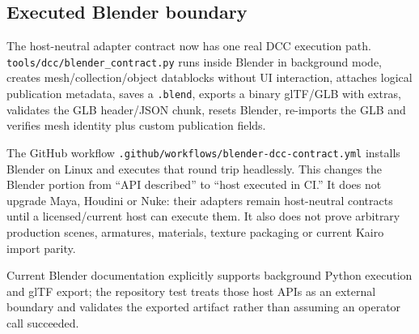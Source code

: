 \subsection{Executed Blender boundary}\label{appendix-03ade9e1875f-executed-blender-boundary}

The host-neutral adapter contract now has one real DCC execution path. \texttt{tools/dcc/blender\_contract.py} runs inside Blender in background mode, creates mesh/collection/object datablocks without UI interaction, attaches logical publication metadata, saves a \texttt{.blend}, exports a binary glTF/GLB with extras, validates the GLB header/JSON chunk, resets Blender, re-imports the GLB and verifies mesh identity plus custom publication fields.

The GitHub workflow \texttt{.github/workflows/blender-dcc-contract.yml} installs Blender on Linux and executes that round trip headlessly. This changes the Blender portion from ``API described'' to ``host executed in CI.'' It does not upgrade Maya, Houdini or Nuke: their adapters remain host-neutral contracts until a licensed/current host can execute them. It also does not prove arbitrary production scenes, armatures, materials, texture packaging or current Kairo import parity.

Current Blender documentation explicitly supports background Python execution and glTF export; the repository test treats those host APIs as an external boundary and validates the exported artifact rather than assuming an operator call succeeded.
